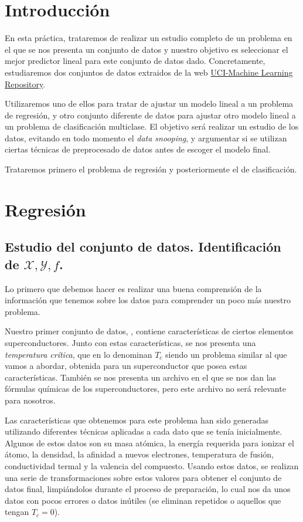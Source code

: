 \documentclass[a4paper, 20pt]{article}
\begin{document}
\section*{Introducción}

En esta práctica, trataremos de realizar un estudio completo de un problema en el que se nos
presenta un conjunto de datos y nuestro objetivo es seleccionar el mejor predictor lineal para
este conjunto de datos dado. Concretamente, estudiaremos dos conjuntos de datos extraidos
de la web \href{https://archive.ics.uci.edu/ml/index.php}{UCI-Machine Learning Repository}.

Utilizaremos uno de ellos para tratar de ajustar un modelo lineal a un problema de regresión, y otro conjunto diferente de datos para ajustar otro modelo lineal a un problema de clasificación multiclase. El objetivo será realizar un estudio de los datos, evitando en todo momento el \emph{data snooping}, y argumentar si se utilizan ciertas técnicas de preprocesado de datos antes de escoger el modelo final.

Trataremos primero el problema de regresión y posteriormente el de clasificación.

\section{Regresión}

\subsection{Estudio del conjunto de datos. Identificación de $\mathcal X,\mathcal Y,f$.}

Lo primero que debemos hacer es realizar una buena comprensión de la información que tenemos sobre los datos para comprender un poco más nuestro problema.

Nuestro primer conjunto de datos, \cite{superdata}, contiene características de ciertos elementos superconductores. Junto con estas características, se nos presenta una \emph{temperatura crítica}, que en \cite{hamidieh} lo denominan $T_c$ siendo un problema similar al que vamos a abordar, obtenida para un superconductor que posea estas características. También se nos presenta un archivo en el que se nos dan las fórmulas químicas de los superconductores, pero este archivo no será relevante para nosotros.

Las características que obtenemos para este problema han sido generadas utilizando diferentes técnicas aplicadas a cada dato que se tenía inicialmente. Algunos de estos datos son su masa atómica, la energía requerida para ionizar el átomo, la densidad, la afinidad a nuevos electrones, temperatura de fusión, conductividad termal y la valencia del compuesto. Usando estos datos, se realizan una serie de transformaciones sobre estos valores para obtener el conjunto de datos final, limpiándolos durante el proceso de preparación, lo cual nos da unos datos con pocos errores o datos inútiles (se eliminan repetidos o aquellos que tengan $T_c = 0$).
\end{document}
